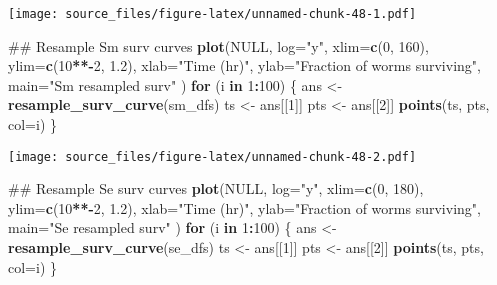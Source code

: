 \documentclass[]{article}
\newenvironment{Shaded}{\begin{snugshade}}{\end{snugshade}}
\newcommand{\KeywordTok}[1]{\textcolor[rgb]{0.13,0.29,0.53}{\textbf{#1}}}
\newcommand{\DataTypeTok}[1]{\textcolor[rgb]{0.13,0.29,0.53}{#1}}
\newcommand{\DecValTok}[1]{\textcolor[rgb]{0.00,0.00,0.81}{#1}}
\newcommand{\FloatTok}[1]{\textcolor[rgb]{0.00,0.00,0.81}{#1}}
\newcommand{\StringTok}[1]{\textcolor[rgb]{0.31,0.60,0.02}{#1}}
\newcommand{\OtherTok}[1]{\textcolor[rgb]{0.56,0.35,0.01}{#1}}
\newcommand{\ControlFlowTok}[1]{\textcolor[rgb]{0.13,0.29,0.53}{\textbf{#1}}}
\newcommand{\OperatorTok}[1]{\textcolor[rgb]{0.81,0.36,0.00}{\textbf{#1}}}
\newcommand{\NormalTok}[1]{#1}
\begin{document}
\texttt{[image: source\_files/figure-latex/unnamed-chunk-48-1.pdf]}

\begin{Shaded}
\begin{Highlighting}[]
\NormalTok{## Resample Sm surv curves}
\KeywordTok{plot}\NormalTok{(}\OtherTok{NULL}\NormalTok{, }
     \DataTypeTok{log=}\StringTok{"y"}\NormalTok{, }
     \DataTypeTok{xlim=}\KeywordTok{c}\NormalTok{(}\DecValTok{0}\NormalTok{, }\DecValTok{160}\NormalTok{), }
     \DataTypeTok{ylim=}\KeywordTok{c}\NormalTok{(}\DecValTok{10}\OperatorTok{**-}\DecValTok{2}\NormalTok{, }\FloatTok{1.2}\NormalTok{),}
     \DataTypeTok{xlab=}\StringTok{"Time (hr)"}\NormalTok{,}
     \DataTypeTok{ylab=}\StringTok{"Fraction of worms surviving"}\NormalTok{,}
     \DataTypeTok{main=}\StringTok{"Sm resampled surv"}
\NormalTok{     )}
\ControlFlowTok{for}\NormalTok{ (i }\ControlFlowTok{in} \DecValTok{1}\OperatorTok{:}\DecValTok{100}\NormalTok{) \{}
\NormalTok{  ans <-}\StringTok{ }\KeywordTok{resample_surv_curve}\NormalTok{(sm_dfs)}
\NormalTok{  ts <-}\StringTok{ }\NormalTok{ans[[}\DecValTok{1}\NormalTok{]]}
\NormalTok{  pts <-}\StringTok{ }\NormalTok{ans[[}\DecValTok{2}\NormalTok{]]}
  \KeywordTok{points}\NormalTok{(ts, pts, }\DataTypeTok{col=}\NormalTok{i)}
\NormalTok{\}}
\end{Highlighting}
\end{Shaded}

\texttt{[image: source\_files/figure-latex/unnamed-chunk-48-2.pdf]}

\begin{Shaded}
\begin{Highlighting}[]
\NormalTok{## Resample Se surv curves}
\KeywordTok{plot}\NormalTok{(}\OtherTok{NULL}\NormalTok{, }
     \DataTypeTok{log=}\StringTok{"y"}\NormalTok{, }
     \DataTypeTok{xlim=}\KeywordTok{c}\NormalTok{(}\DecValTok{0}\NormalTok{, }\DecValTok{180}\NormalTok{), }
     \DataTypeTok{ylim=}\KeywordTok{c}\NormalTok{(}\DecValTok{10}\OperatorTok{**-}\DecValTok{2}\NormalTok{, }\FloatTok{1.2}\NormalTok{),}
     \DataTypeTok{xlab=}\StringTok{"Time (hr)"}\NormalTok{,}
     \DataTypeTok{ylab=}\StringTok{"Fraction of worms surviving"}\NormalTok{,}
     \DataTypeTok{main=}\StringTok{"Se resampled surv"}
\NormalTok{     )}
\ControlFlowTok{for}\NormalTok{ (i }\ControlFlowTok{in} \DecValTok{1}\OperatorTok{:}\DecValTok{100}\NormalTok{) \{}
\NormalTok{  ans <-}\StringTok{ }\KeywordTok{resample_surv_curve}\NormalTok{(se_dfs)}
\NormalTok{  ts <-}\StringTok{ }\NormalTok{ans[[}\DecValTok{1}\NormalTok{]]}
\NormalTok{  pts <-}\StringTok{ }\NormalTok{ans[[}\DecValTok{2}\NormalTok{]]}
  \KeywordTok{points}\NormalTok{(ts, pts, }\DataTypeTok{col=}\NormalTok{i)}
\NormalTok{\}}
\end{Highlighting}
\end{Shaded}
\end{document}
